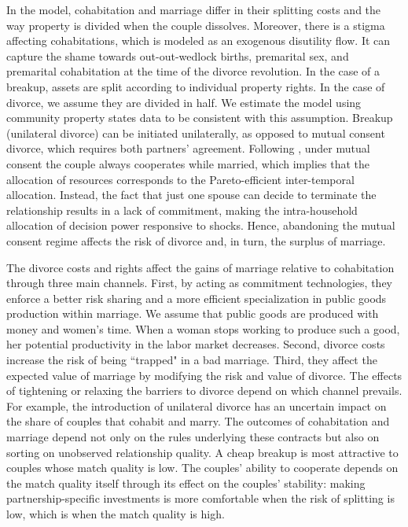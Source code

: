 \documentclass[12pt]{article}
\numberwithin{table}{section}
\begin{document}
In the model, cohabitation and marriage differ in their splitting costs and the way property is divided when the couple dissolves. Moreover, there is a stigma affecting cohabitations, which is modeled as an exogenous disutility flow. It can capture the shame towards out-out-wedlock births, premarital sex, and premarital cohabitation at the time of the divorce revolution. In the case of a breakup, assets are split according to individual property rights. In the case of divorce, we assume they are divided in half. We estimate the model using community property states data to be consistent with this assumption. Breakup (unilateral divorce) can be initiated unilaterally, as opposed to mutual consent divorce, which requires both partners' agreement. Following \cite{voena2015}, under mutual consent the couple always cooperates while married, which implies that the allocation of resources corresponds to the Pareto-efficient inter-temporal allocation. %
Instead, the fact that just one spouse can decide to terminate the relationship results in a lack of commitment, making the intra-household allocation of decision power responsive to shocks. Hence, abandoning the mutual consent regime affects the risk of divorce and, in turn, the surplus of marriage. 

The divorce costs and rights affect the gains of marriage relative to cohabitation through three main channels. First, by acting as commitment technologies, they enforce a better risk sharing and a more efficient specialization in public goods production within marriage. We assume that public goods are produced with money and women's time. When a woman stops working to produce such a good, her potential productivity in the labor market decreases. Second, divorce costs increase the risk of being ``trapped" in a bad marriage. Third, they affect the expected value of marriage by modifying the risk and value of divorce. The effects of tightening or relaxing the barriers to divorce depend on which channel prevails. For example, the introduction of unilateral divorce has an uncertain impact on the share of couples that cohabit and marry. The outcomes of cohabitation and marriage depend not only on the rules underlying these contracts but also on sorting on unobserved relationship quality. A cheap breakup is most attractive to couples whose match quality is low. The couples' ability to cooperate depends on the match quality itself through its effect on the couples' stability: making partnership-specific investments is more comfortable when the risk of splitting is low, which is when the match quality is high.
\end{document}
